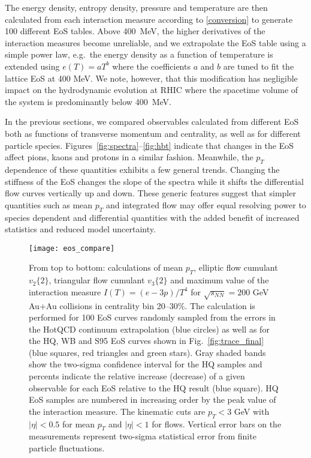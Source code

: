 \documentclass[aps,prc,reprint,amsmath,nofootinbib,superscriptaddress]{revtex4-1}
\begin{document}
The energy density, entropy density, pressure and temperature are then calculated from each interaction measure according to \eqref{conversion} to generate 100 different EoS tables. 
Above 400~MeV, the higher derivatives of the interaction measures become unreliable, and we extrapolate the EoS table using a simple power law, e.g.\ the energy density as a function of temperature is extended using $e(T) = a T^b$ where the coefficients $a$ and $b$ are tuned to fit the lattice EoS at 400 MeV. We note, however, that this modification has negligible impact on the hydrodynamic evolution at RHIC where the spacetime volume of the system is predominantly below 400~MeV.

In the previous sections, we compared observables calculated from different EoS both as functions of transverse momentum and centrality, as well as for different particle species. Figures~\ref{fig:spectra}--\ref{fig:hbt} indicate that changes in the EoS affect pions, kaons and protons in a similar fashion. Meanwhile, the $p_T$ dependence of these quantities exhibits a few general trends. Changing the stiffness of the EoS changes the slope of the spectra while it shifts the differential flow curves vertically up and down. These generic features suggest that simpler quantities such as mean $p_T$ and integrated flow may offer equal resolving power to species dependent and differential quantities with the added benefit of increased statistics and reduced model uncertainty.

\begin{figure}
  \texttt{[image: eos\_compare]}
  \caption{
    \label{fig:eos_compare}
    From top to bottom: calculations of mean $p_T$, elliptic flow cumulant $v_2\{2\}$, triangular flow cumulant $v_3\{2\}$ and maximum value of the interaction measure 
    $I(T) = (e - 3 p)/T^4$ for $\sqrt{s_{NN}}=200$ GeV Au+Au collisions in centrality bin 20--30\%. The calculation is performed for 100 EoS curves randomly sampled from the 
    errors in the HotQCD continuum extrapolation (blue circles) as well as for the HQ, WB and S95 EoS curves shown in Fig.~\ref{fig:trace_final} (blue squares, red triangles 
    and green stars). Gray shaded bands show the two-sigma confidence interval for the HQ samples and percents indicate the relative increase (decrease) of a given observable for each EoS 
    relative to the HQ result (blue square). HQ EoS samples are numbered in increasing order by the peak value of the interaction measure. The kinematic cuts are $p_T < 3$ GeV with 
    $|\eta| < 0.5$ for mean $p_T$ and $|\eta| < 1$ for flows. Vertical error bars on the measurements represent two-sigma statistical error from finite particle fluctuations.
  }
\end{figure}
\end{document}
